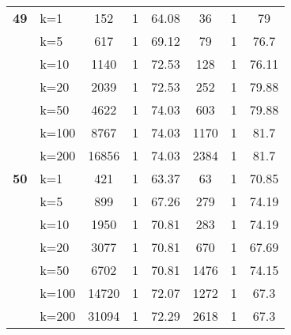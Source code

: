 \begin{table}[htbp]
\begin{tabular}{|l|l|c|c|c|c|c|c|}
    \multicolumn{1}{|r|}{\textbf{49}} & k=1 & 152 & 1 & 64.08 & 36 & 1 & 79 \\ 
     & k=5 & 617 & 1 & 69.12 & 79 & 1 & 76.7 \\ 
     & k=10 & 1140 & 1 & 72.53 & 128 & 1 & 76.11 \\ 
     & k=20 & 2039 & 1 & 72.53 & 252 & 1 & 79.88 \\ 
     & k=50 & 4622 & 1 & 74.03 & 603 & 1 & 79.88 \\ 
     & k=100 & 8767 & 1 & 74.03 & 1170 & 1 & 81.7 \\ 
     & k=200 & 16856 & 1 & 74.03 & 2384 & 1 & 81.7 \\ \hline
    \multicolumn{1}{|r|}{\textbf{50}} & k=1 & 421 & 1 & 63.37 & 63 & 1 & 70.85 \\ 
     & k=5 & 899 & 1 & 67.26 & 279 & 1 & 74.19 \\ 
     & k=10 & 1950 & 1 & 70.81 & 283 & 1 & 74.19 \\ 
     & k=20 & 3077 & 1 & 70.81 & 670 & 1 & 67.69 \\ 
     & k=50 & 6702 & 1 & 70.81 & 1476 & 1 & 74.15 \\ 
     & k=100 & 14720 & 1 & 72.07 & 1272 & 1 & 67.3 \\ 
     & k=200 & 31094 & 1 & 72.29 & 2618 & 1 & 67.3 \\ \hline
    \end{tabular}
\end{table}
